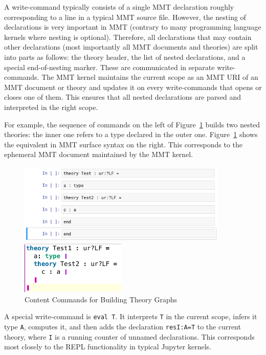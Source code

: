 A write-command typically consists of a single MMT declaration roughly corresponding to a line in a typical MMT source file.
However, the nesting of declarations is very important in MMT (contrary to many programming language kernels where nesting is optional).
Therefore, all declarations that may contain other declarations (most importantly all MMT documents and theories) are split into parts as follows: the theory header, the list of nested declarations, and a special end-of-nesting marker. These are communicated in separate write-commands.
The MMT kernel maintains the current scope as an MMT URI of an MMT document or theory and updates it on every write-commands that opens or closes one of them.
This ensures that all nested declarations are parsed and interpreted in the right scope.

For example, the sequence of commands  on the left of Figure~\ref{fig:test_theory} builds two nested theories: the inner one refers to a type declared in the outer one. Figure~\ref{fig:test_theory} shows the equivalent in MMT surface syntax on the right. This corresponds to the ephemeral MMT document maintained by the MMT kernel.
\begin{figure}[ht]\centering
\begin{minipage}[c]{10cm}\includegraphics[width=10cm]{test_theory_jupyter}\end{minipage}
\begin{minipage}[c]{5cm}\includegraphics[width=5cm]{test_theory}\end{minipage}
\caption{Content Commands for Building Theory Graphs}\label{fig:test_theory}
\end{figure}

A special write-command is \texttt{eval T}.
It interprets \texttt{T} in the current scope, infers it type \texttt{A}, computes it, and then adds the declaration \texttt{resI:A=T} to the current theory, where \texttt{I} is a running counter of unnamed declarations.
This corresponds most closely to the REPL functionality in typical Jupyter kernels.

